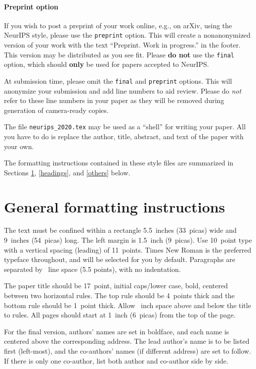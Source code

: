 \documentclass{article}
\begin{document}
\paragraph{Preprint option}
If you wish to post a preprint of your work online, e.g., on arXiv, using the
NeurIPS style, please use the \verb+preprint+ option. This will create a
nonanonymized version of your work with the text ``Preprint. Work in progress.''
in the footer. This version may be distributed as you see fit. Please \textbf{do
  not} use the \verb+final+ option, which should \textbf{only} be used for
papers accepted to NeurIPS.

At submission time, please omit the \verb+final+ and \verb+preprint+
options. This will anonymize your submission and add line numbers to aid
review. Please do \emph{not} refer to these line numbers in your paper as they
will be removed during generation of camera-ready copies.

The file \verb+neurips_2020.tex+ may be used as a ``shell'' for writing your
paper. All you have to do is replace the author, title, abstract, and text of
the paper with your own.

The formatting instructions contained in these style files are summarized in
Sections \ref{gen_inst}, \ref{headings}, and \ref{others} below.

\section{General formatting instructions}
\label{gen_inst}

The text must be confined within a rectangle 5.5~inches (33~picas) wide and
9~inches (54~picas) long. The left margin is 1.5~inch (9~picas).  Use 10~point
type with a vertical spacing (leading) of 11~points.  Times New Roman is the
preferred typeface throughout, and will be selected for you by default.
Paragraphs are separated by ~line space (5.5 points), with no
indentation.

The paper title should be 17~point, initial caps/lower case, bold, centered
between two horizontal rules. The top rule should be 4~points thick and the
bottom rule should be 1~point thick. Allow ~inch space above and
below the title to rules. All pages should start at 1~inch (6~picas) from the
top of the page.

For the final version, authors' names are set in boldface, and each name is
centered above the corresponding address. The lead author's name is to be listed
first (left-most), and the co-authors' names (if different address) are set to
follow. If there is only one co-author, list both author and co-author side by
side.
\end{document}

